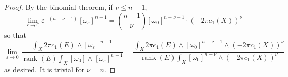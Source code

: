 \documentclass[10pt,a4paper]{amsart}
\newcommand{\e}{\varepsilon}
\DeclareMathOperator{\rank}{rank}
\begin{document}
\begin{proof}
By the binomial theorem, if $\nu \leq n-1$,
\begin{equation*}
    \lim_{\e \to 0} \e^{-(n-\nu-1)} [\omega_{\e}]^{n-1} = {n-1 \choose \nu} [\omega_0]^{n -\nu - 1} \cdot (-2 \pi c_1(X))^\nu
\end{equation*}
so that
\begin{equation*}
    \lim_{\e \to 0} \frac{\int_X 2 \pi c_1(E) \wedge [\omega_{\e}]^{n-1}}{\rank(E) \int_X [\omega_0] \wedge [\omega_\e]^{n-1}} = \frac{\int_X 2 \pi c_1(E) \wedge [\omega_0]^{n-\nu-1} \wedge (-2 \pi c_1(X))^\nu}{\rank(E)\int_X [\omega_0]^{n-\nu} \wedge (-2 \pi c_1(X))^{\nu}} 
\end{equation*}
as desired. It is trivial for $\nu = n$.
\end{proof}
\end{document}
